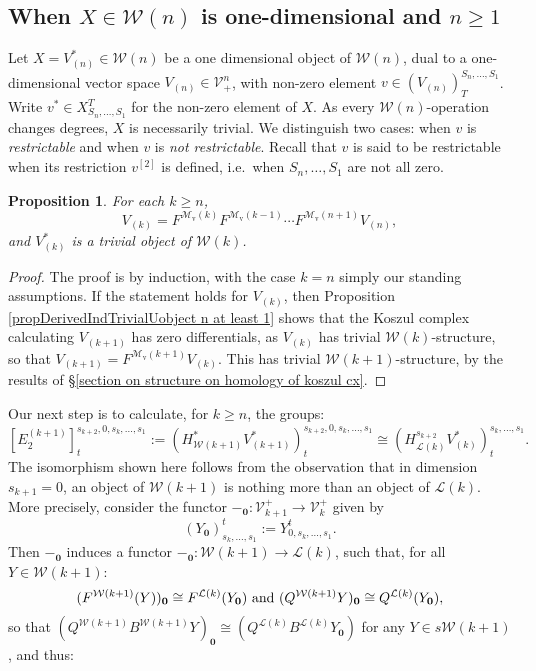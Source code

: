 \documentclass[11pt]{amsart} \renewcommand{\baselinestretch}{1.2}
\theoremstyle{plain}
\newtheorem{prop}[thm]{Proposition}
\numberwithin{equation}{section} %
\theoremstyle{plain}
\newtheorem{prop}[thm]{Proposition}
\numberwithin{equation}{chapter} %
\newcommand{\DASH}{\mathrm{-}}
\renewcommand{\to}{\longrightarrow}
\newcommand{\calL}{\mathcal{L}}
\newcommand{\calV}{\mathcal{V}}
\newcommand{\calw}{\mathcal{W}}
\newcommand{\calMv}{\mathcal{M}\dver}
\newcommand{\restn}[1]{#1^{[2]}}
\newcommand{\vect}[2]{\calV^{#1}_{#2}}
\newcommand{\E}[5]{[E^{#1}_{#2}#3]^{#4}_{#5}}
\newcommand{\dver}{_\mathrm{v}}
\newcommand{\SubsectionOrSection}[1]{\subsection{#1}}
\begin{document}
\begin{Calculations of HWn}
\SubsectionOrSection{When $X\in\calw(n)$ is one-dimensional and $n\geq1$}
\label{one-dimensional, n geq1}
Let $X=V^*_{(n)}\in\calw(n)$ be a one dimensional object of $\calw(n)$, %
dual to a one-dimensional vector space $V_{(n)}\in\vect{n}{+}$, with non-zero element $v\in(V_{(n)})^{S_n,\ldots,S_1}_T$. Write $v^*\in X^T_{S_n,\ldots,S_1}$ for the non-zero element of $X$. As every $\calw(n)$-operation changes degrees, $X$ is necessarily trivial. We distinguish two cases: when $v$ is \emph{restrictable} and when $v$ is \emph{not restrictable}. Recall that $v$ is said to be restrictable when its restriction $\restn{v}$ is defined, i.e.\ when $S_n,\ldots,S_1$ are not all zero.
\begin{prop}
\label{iterative calc of the Vk all trivial}
For each $k\geq n$,
\[V_{(k)}=F^{\calMv(k)}F^{\calMv(k-1)}\cdots F^{\calMv(n+1)}V_{(n)},\]
and $V^*_{(k)}$ is a trivial object of $\calw(k)$.
\end{prop}
\begin{proof}
The proof is by induction, with the case $k=n$ simply our standing assumptions. If the statement holds for $V_{(k)}$, then Proposition \ref{propDerivedIndTrivialUobject n at least 1} shows that the Koszul complex calculating $V_{(k+1)}$ has zero differentials, as $V_{(k)}$ has trivial $\calw(k)$-structure, so that $V_{(k+1)}=F^{\calMv(k+1)}V_{(k)}$. This has trivial $\calw(k+1)$-structure, by the results of \S\ref{section on structure on homology of koszul cx}.
\end{proof}
Our next step is to calculate, for $k\geq n$, the groups:
\[\E{(k+1)}{2}{}{s_{k+2},0,s_k,\ldots,s_1}{t}:=(H^*_{\calw(k+1)}V^*_{(k+1)})^{s_{k+2},0,s_k,\ldots,s_1}_{t}\cong (H^{s_{k+2}}_{\calL(k)}V^*_{(k)})^{s_k,\ldots,s_1}_{t}.\]
The isomorphism shown here follows from the observation that in dimension $s_{k+1}=0$, an object of $\calw(k+1)$ is nothing more than an object of $\calL(k)$. More precisely, consider the functor $\DASH_\textbf{0}:\vect{+}{k+1}\to \vect{+}{k}$ given by
\[(Y_\textbf{0})^t_{s_k,\ldots,s_1}:=Y^t_{0,s_k,\ldots,s_1}.\]
Then $\DASH_\textbf{0}$ induces a functor $\DASH_\textbf{0}:\calw(k+1)\to \calL(k)$, such that, for all $Y\in\calw(k+1)$:
\[(F^{\calw(k+1)}(Y))_\textbf{0}\cong F^{\calL(k)}(Y_\textbf{0})\textup{ and }(Q^{\calw(k+1)}Y)_\textbf{0}\cong Q^{\calL(k)}(Y_\textbf{0}),\]
so that $(Q^{\calw(k+1)}B^{\calw(k+1)}Y)_{\textbf{0}} \cong(Q^{\calL(k)}B^{\calL(k)}Y_{\textbf{0}})$ for any $Y\in s\calw(k+1)$, and thus:

\end{Calculations of HWn}
\end{document}

